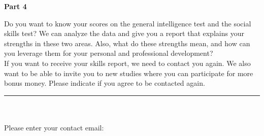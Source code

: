 \documentclass[11pt,a4paper,oneside]{article}
\begin{document}
\noindent \textbf{Part 4}

\noindent Do you want to know your scores on the general intelligence test and the social skills test? We can analyze the data and give you a report that explains your strengths in these two areas. Also, what do these strengths mean, and how can you leverage them for your personal and professional development? \\

\noindent If you want to receive your skills report, we need to contact you again. We also want to be able to invite you to new studies where you can participate for more bonus money. Please indicate if you agree to be contacted again. \\


\noindent\rule{\textwidth}{0.4pt}\\

 \\

\noindent Please enter your contact email: \\

\\
\end{document}
